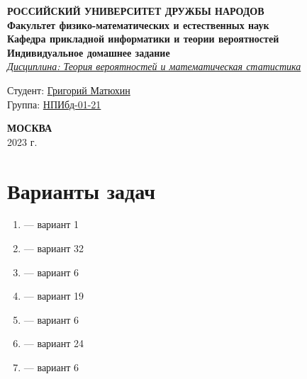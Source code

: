 \documentclass[12pt]{article}
\begin{document}
\begin{titlepage}

	\begin{center}
		\hfill \break
		\textbf{
			\large{РОССИЙСКИЙ УНИВЕРСИТЕТ ДРУЖБЫ НАРОДОВ}\\
			\normalsize{Факультет физико-математических и естественных наук}\\
			\normalsize{Кафедра прикладной информатики и теории вероятностей}\\
		}
		\vspace*{\fill}
		\Large{\textbf{Индивидуальное домашнее задание }}
		\\
		\underline{\textit{\normalsize{Дисциплина: Теория вероятностей и математическая статистика}}}
		\vspace*{\fill}

	\end{center}

	\begin{flushright}
		Студент: \underline{Григорий Матюхин}\\ \vspace{0.5cm}
		Группа: \underline{НПИбд-01-21}
	\end{flushright}


	\begin{center} \textbf{МОСКВА} \\ 2023 г. \end{center}
	\thispagestyle{empty} %

\end{titlepage}
\newpage
\tableofcontents
\newpage

\section{Варианты задач}

\begin{enumerate}
	\item --- вариант 1
	\item --- вариант 32
	\item --- вариант 6
	\item --- вариант 19
	\item --- вариант 6
	\item --- вариант 24
	\item --- вариант 6
\end{enumerate}
\end{document}
